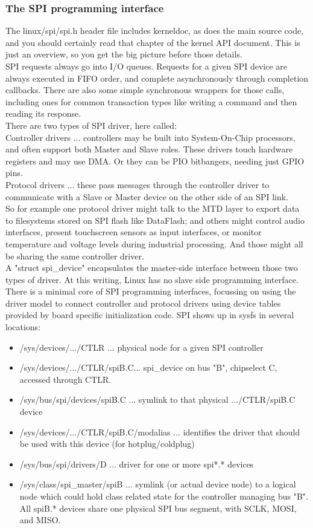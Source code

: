 \subsubsection{The SPI programming interface}
The linux/spi/spi.h header file includes kerneldoc, as does the main source code, and you should certainly read that chapter of the kernel API document.  This is just an overview, so you get the big picture before those details. \\
SPI requests always go into I/O queues.  Requests for a given SPI device are always executed in FIFO order, and complete asynchronously through completion callbacks.  There are also some simple synchronous wrappers for those calls, including ones for common transaction types like writing a command and then reading its response. \\
There are two types of SPI driver, here called: \\
Controller drivers ... controllers may be built into System-On-Chip 	processors, and often support both Master and Slave roles. 	These drivers touch hardware registers and may use DMA. 	Or they can be PIO bitbangers, needing just GPIO pins.\\ 
Protocol drivers ... these pass messages through the controller 	driver to communicate with a Slave or Master device on the 	other side of an SPI link. \\
So for example one protocol driver might talk to the MTD layer to export data to filesystems stored on SPI flash like DataFlash; and others might control audio interfaces, present touchscreen sensors as input interfaces, or monitor temperature and voltage levels during industrial processing. And those might all be sharing the same controller driver.\\
A "struct spi\_device" encapsulates the master-side interface between those two types of driver.  At this writing, Linux has no slave side programming interface. \\
There is a minimal core of SPI programming interfaces, focussing on using the driver model to connect controller and protocol drivers using device tables provided by board specific initialization code.  SPI shows up in sysfs in several locations: 
\begin{itemize}
	\item /sys/devices/.../CTLR ... physical node for a given SPI controller 
	\item /sys/devices/.../CTLR/spiB.C... spi\_device on bus "B", chipselect C, accessed through CTLR. 
	\item /sys/bus/spi/devices/spiB.C ... symlink to that physical .../CTLR/spiB.C device 
	\item /sys/devices/.../CTLR/spiB.C/modalias ... identifies the driver that should be used with this device (for hotplug/coldplug) 
	\item /sys/bus/spi/drivers/D ... driver for one or more spi*.* devices 
	\item /sys/class/spi\_master/spiB ... symlink (or actual device node) to a logical node which could hold class related state for the controller managing bus "B". All spiB.* devices share one physical SPI bus segment, with SCLK, MOSI, and MISO. 
\end{itemize}
